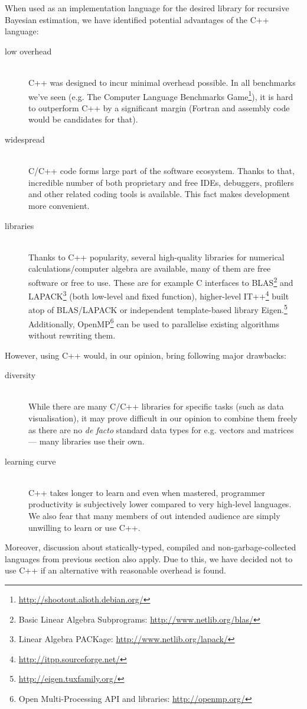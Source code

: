 When used as an implementation language for the desired library for recursive Bayesian estimation, we
have identified potential advantages of the C++ language:
\begin{description}
	\item[low overhead] \hfill \\
		C++ was designed to incur minimal overhead possible. In all benchmarks we've seen (e.g. The
		Computer Language Benchmarks Game\footnote{\url{http://shootout.alioth.debian.org/}}), it is
		hard to outperform C++ by a significant margin (Fortran and assembly code would be
		candidates for that).
	\item[widespread] \hfill \\
		C/C++ code forms large part of the software ecosystem. Thanks to that, incredible number of
		both proprietary and free IDEs, debuggers,
		profilers and other related coding tools is available. This fact makes development more
		convenient.
	\item[libraries] \hfill \\
		Thanks to C++ popularity, several high-quality libraries for numerical calculations/computer
		algebra are available, many of them are free software or free to use. These are for example
		C interfaces to BLAS\footnote{Basic Linear Algebra Subprograms: \url{http://www.netlib.org/blas/}}
		and LAPACK\footnote{Linear Algebra PACKage: \url{http://www.netlib.org/lapack/}} (both low-level
		and fixed function), higher-level IT++\footnote{\url{http://itpp.sourceforge.net/}} built
		atop of BLAS/LAPACK or independent template-based library
		Eigen.\footnote{\url{http://eigen.tuxfamily.org/}} Additionally,
		OpenMP\footnote{Open Multi-Processing API and libraries: \url{http://openmp.org/}}
		can be used to parallelise existing algorithms without rewriting them.
\end{description}
However, using C++ would, in our opinion, bring following major drawbacks:
\begin{description}
	\item[diversity] \hfill \\
		While there are many C/C++ libraries for specific tasks (such as data visualisation), it
		may prove difficult in our opinion to combine them freely as there are no \emph{de facto}
		standard data types for e.g. vectors and matrices --- many libraries use their own.
	\item[learning curve] \hfill \\
		C++ takes longer to learn and even when mastered, programmer productivity is subjectively
		lower compared to very high-level languages. We also fear that many members of out intended
		audience are simply unwilling to learn or use C++.
\end{description}
Moreover, discussion about statically-typed, compiled and non-garbage-collected languages from
previous section also apply. Due to this, we have decided not to use C++ if an alternative with
reasonable overhead is found.

